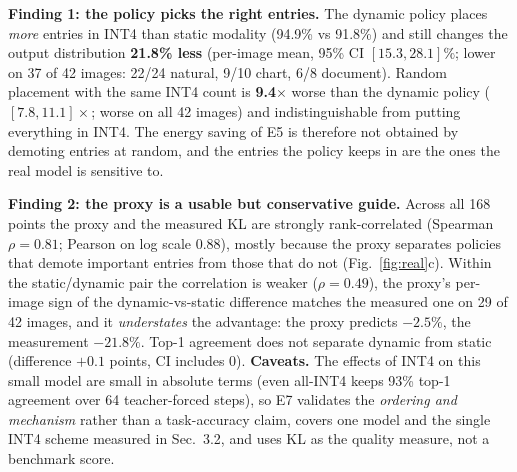 \textbf{Finding 1: the policy picks the right entries.} The dynamic policy places \emph{more} entries in INT4 than static modality (94.9\% vs 91.8\%) and still changes the output distribution \textbf{21.8\% less} (per-image mean, 95\% CI $[15.3,28.1]\%$; lower on 37 of 42 images: 22/24 natural, 9/10 chart, 6/8 document). Random placement with the same INT4 count is \textbf{9.4$\times$} worse than the dynamic policy ($[7.8,11.1]\times$; worse on all 42 images) and indistinguishable from putting everything in INT4. The energy saving of E5 is therefore not obtained by demoting entries at random, and the entries the policy keeps in \hot{} are the ones the real model is sensitive to.

\textbf{Finding 2: the proxy is a usable but conservative guide.} Across all 168 points the proxy and the measured KL are strongly rank-correlated (Spearman $\rho{=}0.81$; Pearson on log scale 0.88), mostly because the proxy separates policies that demote important entries from those that do not (Fig.~\ref{fig:real}c). Within the static/dynamic pair the correlation is weaker ($\rho{=}0.49$), the proxy's per-image sign of the dynamic-vs-static difference matches the measured one on 29 of 42 images, and it \emph{understates} the advantage: the proxy predicts $-2.5\%$, the measurement $-21.8\%$. Top-1 agreement does not separate dynamic from static (difference $+0.1$ points, CI includes 0). \textbf{Caveats.} The effects of INT4 on this small model are small in absolute terms (even all-INT4 keeps 93\% top-1 agreement over 64 teacher-forced steps), so E7 validates the \emph{ordering and mechanism} rather than a task-accuracy claim, covers one model and the single INT4 scheme measured in Sec.~3.2, and uses KL as the quality measure, not a benchmark score.
